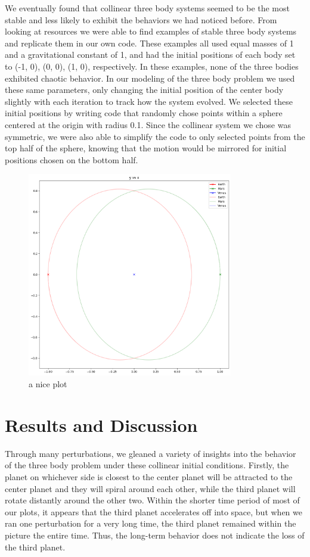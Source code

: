 \documentclass{article}
\begin{document}
We eventually found that collinear three body systems seemed to be the most stable and less likely to exhibit the behaviors we had noticed before. From looking at resources we were able to find examples of stable three body systems and replicate them in our own code. These examples all used equal masses of 1 and a gravitational constant of 1, and had the initial positions of each body set to (-1, 0), (0, 0), (1, 0), respectively. In these examples, none of the three bodies exhibited chaotic behavior.
In our modeling of the three body problem we used these same parameters, only changing the initial position of the center body slightly with each iteration to track how the system evolved. We selected these initial positions by writing code that randomly chose points within a sphere centered at the origin with radius 0.1. Since the collinear system we chose was symmetric, we were also able to simplify the code to only selected points from the top half of the sphere, knowing that the motion would be mirrored for initial positions chosen on the bottom half. 

\begin{figure}[h!]
    \centering
    \includegraphics[width=0.8\textwidth]{Images/noPerterbations.png}
    \caption{a nice plot}
    \label{fig:mesh2}
\end{figure}

\section{Results and Discussion}
Through many perturbations, we gleaned a variety of insights into the behavior of the three body problem under these collinear initial conditions. Firstly, the planet on whichever side is closest to the center planet will be attracted to the center planet and they will spiral around each other, while the third planet will rotate distantly around the other two. Within the shorter time period of most of our plots, it appears that the third planet accelerates off into space, but when we ran one perturbation for a very long time, the third planet remained within the picture the entire time. Thus, the long-term behavior does not indicate the loss of the third planet. 
\end{document}
